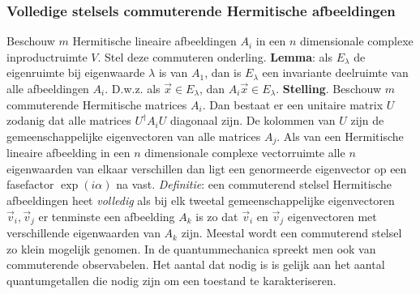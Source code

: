 \documentclass[twoside]{report}
\begin{document}
\subsubsection{Volledige stelsels commuterende Hermitische afbeeldingen}
Beschouw $m$ Hermitische lineaire afbeeldingen $A_i$ in een $n$ dimensionale
complexe inproductruimte $V$. Stel deze commuteren onderling.
\npar
{\bf Lemma}: als $E_\lambda$ de eigenruimte bij eigenwaarde $\lambda$ is van
$A_1$, dan is $E_\lambda$ een invariante deelruimte van alle afbeeldingen
$A_i$. D.w.z. als $\vec{x}\in E_\lambda$, dan $A_i\vec{x}\in E_\lambda$.
\npar
{\bf Stelling}. Beschouw $m$ commuterende Hermitische matrices $A_i$. Dan
bestaat er een unitaire matrix $U$ zodanig dat alle matrices $U^\dagger A_iU$
diagonaal zijn. De kolommen van $U$ zijn de gemeenschappelijke eigenvectoren
van alle matrices $A_j$.
\npar
Als van een Hermitische lineaire afbeelding in een $n$ dimensionale complexe
vectorruimte alle $n$ eigenwaarden van elkaar verschillen dan ligt een
genormeerde eigenvector op een fasefactor $\exp(i\alpha)$ na vast.
\npar
{\it Definitie}: een commuterend stelsel Hermitische afbeeldingen heet
{\it volledig} als bij elk tweetal gemeenschappelijke eigenvectoren $\vec{v}_i,\vec{v}_j$
er tenminste een afbeelding $A_k$ is zo dat $\vec{v}_i$ en $\vec{v}_j$ eigenvectoren
met verschillende eigenwaarden van $A_k$ zijn.
\npar
Meestal wordt een commuterend stelsel zo klein mogelijk genomen. In de
quantummechanica spreekt men ook van commuterende observabelen. Het aantal
dat nodig is is gelijk aan het aantal quantumgetallen die nodig zijn om een
toestand te karakteriseren.
\end{document}
